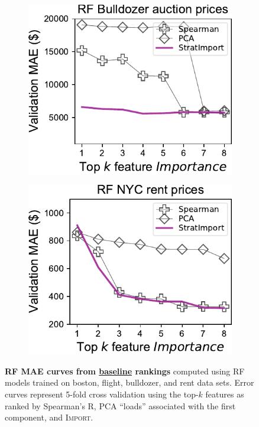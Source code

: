 \documentclass[11pt]{article}
\newcommand{\Impo}{\fontfamily{cmr}\textsc{Import}}
\begin{document}
\begin{figure}
\begin{subfigure}{.245\textwidth}
    \centering
\includegraphics[scale=0.45]{images/bulldozer-topk-RF-baseline.pdf}
\vspace{-7mm}
\subcaption{}
\end{subfigure}
\begin{subfigure}{.245\textwidth}
    \centering
\includegraphics[scale=0.45]{images/rent-topk-RF-baseline.pdf}
\vspace{-7mm}
\subcaption{}
\end{subfigure} 
\vspace{-3mm}
\caption{\small {\bf RF MAE curves from \underline{baseline} rankings} computed using RF models trained on boston, flight, bulldozer, and rent data sets. Error curves represent 5-fold cross validation using the top-$k$ features as ranked by Spearman's R, PCA ``loads'' associated with the first component, and \Impo{}.}
\label{fig:baseline}
\end{figure}
\end{document}
